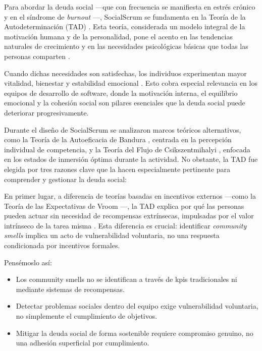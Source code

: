 Para abordar la deuda social —que con frecuencia se manifiesta en estrés crónico y en el síndrome de \textit{burnout} \cite{wilson_all_2006,tulili2022burnout}—, SocialScrum se fundamenta en la Teoría de la Autodeterminación (TAD) \cite{ryan_self-determination_2000}.
Esta teoría, considerada un modelo integral de la motivación humana y de la personalidad, pone el acento en las tendencias naturales de crecimiento y en las necesidades psicológicas básicas que todas las personas comparten \cite{ryan_self-determination_2000}.

Cuando dichas necesidades son satisfechas, los individuos experimentan mayor vitalidad, bienestar y estabilidad emocional \cite{ryan_self-determination_2000}. Esto cobra especial relevancia en los equipos de desarrollo de software, donde la motivación interna, el equilibrio emocional y la cohesión social son pilares esenciales que la deuda social puede deteriorar progresivamente.

Durante el diseño de SocialScrum se analizaron marcos teóricos alternativos, como la Teoría de la Autoeficacia de Bandura \cite{bandura1997self}, centrada en la percepción individual de competencia, y la Teoría del Flujo de Csikszentmihalyi \cite{csikszentmihalyi1990flow}, enfocada en los estados de inmersión óptima durante la actividad.
No obstante, la TAD fue elegida por tres razones clave que la hacen especialmente pertinente para comprender y gestionar la deuda social:

En primer lugar, a diferencia de teorías basadas en incentivos externos —como la Teoría de las Expectativas de Vroom \cite{vroom1964work}—, la TAD explica por qué las personas pueden actuar sin necesidad de recompensas extrínsecas, impulsadas por el valor intrínseco de la tarea misma \cite{ryan_self-determination_2000}.
Esta diferencia es crucial: identificar \textit{community smells} implica un acto de vulnerabilidad voluntaria, no una respuesta condicionada por incentivos formales.

Pensémoslo así:

\begin{itemize}
    \item Los community smells no se identifican a través de \acrfull{kpis} tradicionales ni mediante sistemas de recompensas.
    \item Detectar problemas sociales dentro del equipo exige vulnerabilidad voluntaria, no simplemente el cumplimiento de objetivos.
    \item Mitigar la deuda social de forma sostenible requiere compromiso genuino, no una adhesión superficial por cumplimiento.
\end{itemize}

